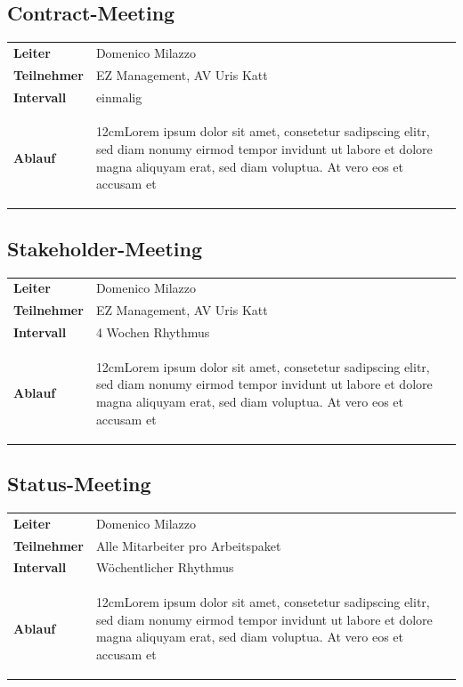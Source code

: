 \documentclass[a4paper,10pt]{scrartcl}
\newcommand\Absatz[2][12cm]{\begin{varwidth}{#1}\flushleft#2\end{varwidth}}
\begin{document}
\subsection{Contract-Meeting}
\begin{tabular}{ll} 
\toprule
\textbf{Leiter} & Domenico Milazzo\\
\textbf{Teilnehmer}  & EZ Management, AV Uris Katt\\
\midrule 
\textbf{Intervall}  & einmalig\\
\midrule 
\textbf{Ablauf}  & {\Absatz{Lorem ipsum dolor sit amet, consetetur sadipscing elitr, sed diam nonumy eirmod tempor invidunt ut labore et dolore magna aliquyam erat, sed diam voluptua. At vero eos et accusam et \linebreak}}\\
\bottomrule
\end{tabular}
\vspace{5mm}

\subsection{Stakeholder-Meeting}
\begin{tabular}{ll} 
\toprule
\textbf{Leiter} & Domenico Milazzo\\
\textbf{Teilnehmer}  & EZ Management, AV Uris Katt\\
\midrule 
\textbf{Intervall}  & 4 Wochen Rhythmus\\
\midrule 
\textbf{Ablauf}  & {\Absatz{Lorem ipsum dolor sit amet, consetetur sadipscing elitr, sed diam nonumy eirmod tempor invidunt ut labore et dolore magna aliquyam erat, sed diam voluptua. At vero eos et accusam et \linebreak}}\\
\bottomrule
\end{tabular}
\vspace{5mm}

\subsection{Status-Meeting}
\begin{tabular}{ll} 
\toprule
\textbf{Leiter} & Domenico Milazzo\\
\textbf{Teilnehmer}  & Alle Mitarbeiter pro Arbeitspaket\\
\midrule 
\textbf{Intervall}  & Wöchentlicher Rhythmus\\
\midrule 
\textbf{Ablauf}  & {\Absatz{Lorem ipsum dolor sit amet, consetetur sadipscing elitr, sed diam nonumy eirmod tempor invidunt ut labore et dolore magna aliquyam erat, sed diam voluptua. At vero eos et accusam et \linebreak}}\\
\bottomrule
\end{tabular}
\end{document}
